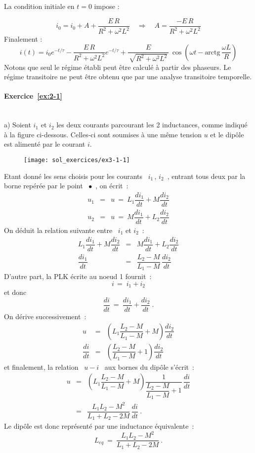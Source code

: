 La condition initiale en $t=0$ impose :

\[i_0=i_0+A+ \frac{E\, R}{R^2 + \omega ^2L^2} \quad \Rightarrow
\quad A=\frac{-E\, R}{R^2+\omega^2L^2}\]
Finalement :
\[i(t)=i_0e^{-t/\tau}-\frac{E\, R}{R^2+\omega^2L^2}e^{-t/\tau}+\frac{E}{\, \sqrt{R^2 + \omega ^2L^2}\, }\,
\cos \left( \omega t - \mbox{arctg} \, \frac{\omega L}{R} \right)\]
Notons que seul le régime établi peut être calculé à partir des
phaseurs. Le régime transitoire ne peut être obtenu que par une
analyse transitoire temporelle.

\paragraph{Exercice~\ref{ex:2-1}}~\\%
a) Soient $i_1$ et $i_2$ les deux courants parcourant les 2
inductances, comme indiqué à la figure ci-dessous. Celles-ci sont
soumises à une même tension $u$ et le dipôle est alimenté par le
courant $i$.
\begin{figure}[h]
	\begin{center}
		\texttt{[image: sol\_exercices/ex3-1-1]}
	\end{center}
	\caption{}\label{ex3-1-1s}
\end{figure}
Etant donné les sens choisis pour les courants \ $i_1\, , \, i_2$~,
entrant tous deux par la borne repérée par le point \ $\bullet$~, on
écrit~:
\begin{eqnarray*}
	u_1 &=& u \: = \: L_1 \dfrac{di_1}{dt} + M \dfrac{di_2}{dt}\\
	u_2 &=& u \: = \: M \dfrac{di_1}{dt} + L_2 \dfrac{di_2}{dt}
\end{eqnarray*}
On déduit la relation suivante entre \ $i_1$ et $i_2$~:
\begin{eqnarray*}
	L_1 \dfrac{di_1}{dt} + M \dfrac{di_2}{dt} &=&  M \dfrac{di_1}{dt} + L_2 \dfrac{di_2}{dt}\\
	\dfrac{di_1}{dt} &=& \dfrac{L_2-M}{L_1-M} \, \dfrac{di_2}{dt}
\end{eqnarray*}
D'autre part, la PLK écrite au noeud 1 fournit~:
\[ i\,=\; i_1+i_2 \]
et donc
\[ \dfrac{di}{dt} \: = \: \dfrac{di_1}{dt} + \dfrac{di_2}{dt}~. \]
On dérive successivement~:
\begin{eqnarray*}
	u &=& \left( L_1 \dfrac{L_2-M}{L_1-M} + M \right)  \dfrac{di_2}{dt}\\
	\dfrac{di}{dt} &=& \left( \dfrac{L_2-M}{L_1-M} + 1 \right)  \dfrac{di_2}{dt} 
\end{eqnarray*}
et finalement, la relation \ $u-i$ \ aux bornes du dipôle s'écrit~:
\begin{eqnarray*}
	u &=& \left( L_1 \dfrac{L_2-M}{L_1-M} + M \right) \dfrac{1}{\dfrac{L_2-M}{L_1-M} + 1} \,
	\dfrac{di}{dt}\\
	&=& \dfrac{L_1L_2 - M^2}{L_1+L_2-2M} \,  \dfrac{di}{dt}~. 
\end{eqnarray*}
Le dipôle est donc représenté par une inductance équivalente~:
\[ L_{eq} \: = \: \dfrac{L_1L_2-M^2}{L_1+L_2-2M}~. \]

